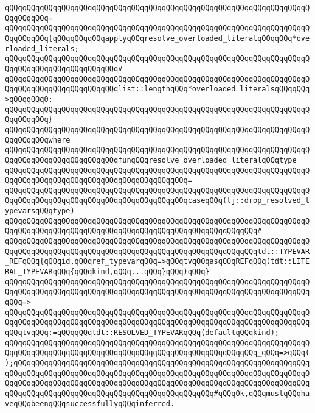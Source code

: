 \verb|qQQqqQQqqQQqqQQqqQQqqQQqqQQqqQQqqQQqqQQqqQQqqQQqqQQqqQQqqQQqqQQqqQQqqQQqqQQqqQQq=|\newline
\verb|qQQqqQQqqQQqqQQqqQQqqQQqqQQqqQQqqQQqqQQqqQQqqQQqqQQqqQQqqQQqqQQqqQQqqQQqqQQqqQQq{qQQqqQQqqQQqapplyqQQqresolve_overloaded_literalqQQqqQQq*overloaded_literals;|\newline
\verb|qQQqqQQqqQQqqQQqqQQqqQQqqQQqqQQqqQQqqQQqqQQqqQQqqQQqqQQqqQQqqQQqqQQqqQQqqQQqqQQqqQQqqQQqqQQqqQQq#|\newline
\verb|qQQqqQQqqQQqqQQqqQQqqQQqqQQqqQQqqQQqqQQqqQQqqQQqqQQqqQQqqQQqqQQqqQQqqQQqqQQqqQQqqQQqqQQqqQQqqQQqlist::lengthqQQq*overloaded_literalsqQQqqQQq>qQQqqQQq0;|\newline
\verb|qQQqqQQqqQQqqQQqqQQqqQQqqQQqqQQqqQQqqQQqqQQqqQQqqQQqqQQqqQQqqQQqqQQqqQQqqQQqqQQq}|\newline
\verb|qQQqqQQqqQQqqQQqqQQqqQQqqQQqqQQqqQQqqQQqqQQqqQQqqQQqqQQqqQQqqQQqqQQqqQQqqQQqqQQqwhere|\newline
\verb|qQQqqQQqqQQqqQQqqQQqqQQqqQQqqQQqqQQqqQQqqQQqqQQqqQQqqQQqqQQqqQQqqQQqqQQqqQQqqQQqqQQqqQQqqQQqqQQqfunqQQqresolve_overloaded_literalqQQqtype|\newline
\verb|qQQqqQQqqQQqqQQqqQQqqQQqqQQqqQQqqQQqqQQqqQQqqQQqqQQqqQQqqQQqqQQqqQQqqQQqqQQqqQQqqQQqqQQqqQQqqQQqqQQqqQQqqQQqqQQq=|\newline
\verb|qQQqqQQqqQQqqQQqqQQqqQQqqQQqqQQqqQQqqQQqqQQqqQQqqQQqqQQqqQQqqQQqqQQqqQQqqQQqqQQqqQQqqQQqqQQqqQQqqQQqqQQqqQQqqQQqcaseqQQq(tj::drop_resolved_typevarsqQQqtype)|\newline
\verb|qQQqqQQqqQQqqQQqqQQqqQQqqQQqqQQqqQQqqQQqqQQqqQQqqQQqqQQqqQQqqQQqqQQqqQQqqQQqqQQqqQQqqQQqqQQqqQQqqQQqqQQqqQQqqQQqqQQqqQQqqQQqqQQq#|\newline
\verb|qQQqqQQqqQQqqQQqqQQqqQQqqQQqqQQqqQQqqQQqqQQqqQQqqQQqqQQqqQQqqQQqqQQqqQQqqQQqqQQqqQQqqQQqqQQqqQQqqQQqqQQqqQQqqQQqqQQqqQQqqQQqqQQqtdt::TYPEVAR_REFqQQq{qQQqid,qQQqref_typevarqQQq=>qQQqtvqQQqasqQQqREFqQQq(tdt::LITERAL_TYPEVARqQQq{qQQqkind,qQQq...qQQq}qQQq)qQQq}|\newline
\verb|qQQqqQQqqQQqqQQqqQQqqQQqqQQqqQQqqQQqqQQqqQQqqQQqqQQqqQQqqQQqqQQqqQQqqQQqqQQqqQQqqQQqqQQqqQQqqQQqqQQqqQQqqQQqqQQqqQQqqQQqqQQqqQQqqQQqqQQqqQQqqQQq=>|\newline
\verb|qQQqqQQqqQQqqQQqqQQqqQQqqQQqqQQqqQQqqQQqqQQqqQQqqQQqqQQqqQQqqQQqqQQqqQQqqQQqqQQqqQQqqQQqqQQqqQQqqQQqqQQqqQQqqQQqqQQqqQQqqQQqqQQqqQQqqQQqqQQqqQQqtvqQQq:=qQQqqQQqtdt::RESOLVED_TYPEVARqQQq(defaultqQQqkind);|\newline
\newline
\verb|qQQqqQQqqQQqqQQqqQQqqQQqqQQqqQQqqQQqqQQqqQQqqQQqqQQqqQQqqQQqqQQqqQQqqQQqqQQqqQQqqQQqqQQqqQQqqQQqqQQqqQQqqQQqqQQqqQQqqQQqqQQqqQQq_qQQq=>qQQq();qQQqqQQqqQQqqQQqqQQqqQQqqQQqqQQqqQQqqQQqqQQqqQQqqQQqqQQqqQQqqQQqqQQqqQQqqQQqqQQqqQQqqQQqqQQqqQQqqQQqqQQqqQQqqQQqqQQqqQQqqQQqqQQqqQQqqQQqqQQqqQQqqQQqqQQqqQQqqQQqqQQqqQQqqQQqqQQqqQQqqQQqqQQqqQQqqQQqqQQqqQQqqQQqqQQqqQQqqQQqqQQqqQQqqQQqqQQqqQQqqQQqqQQqqQQqqQQq#qQQqOk,qQQqmustqQQqhaveqQQqbeenqQQqsuccessfullyqQQqinferred.|\newline
